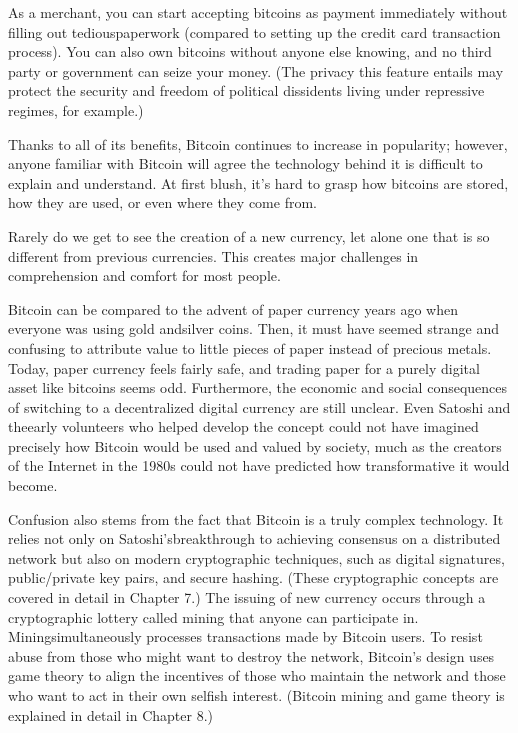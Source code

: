 \par As a merchant, you can start accepting bitcoins as payment immediately without filling out tediouspaperwork (compared to setting up the credit card transaction process). You can also own bitcoins without anyone else knowing, and no third party or government can seize your money. (The privacy this feature entails may protect the security and freedom of political dissidents living under repressive regimes, for example.)

\par Thanks to all of its benefits, Bitcoin continues to increase in popularity; however, anyone familiar with Bitcoin will agree the technology behind it is difficult to explain and understand. At first blush, it’s hard to grasp how bitcoins are stored, how they are used, or even where they come from.


\par Rarely do we get to see the creation of a new currency, let alone one that is so different from previous currencies. This creates major challenges in comprehension and comfort for most people.

\par Bitcoin can be compared to the advent of paper currency years ago when everyone was using gold andsilver coins. Then, it must have seemed strange and confusing to attribute value to little pieces of paper instead of precious metals. Today, paper currency feels fairly safe, and trading paper for a purely digital asset like bitcoins seems odd. Furthermore, the economic and social consequences of switching to a decentralized digital currency are still unclear. Even Satoshi and theearly volunteers who helped develop the concept could not have imagined precisely how Bitcoin would be used and valued by society, much as the creators of the Internet in the 1980s could not have predicted how transformative it would become.

\par Confusion also stems from the fact that Bitcoin is a truly complex technology. It relies not only on Satoshi’sbreakthrough to achieving consensus on a distributed network but also on modern cryptographic techniques, such as digital signatures, public/private key pairs, and secure hashing. (These cryptographic concepts are covered in detail in Chapter 7.) The issuing of new currency occurs through a cryptographic lottery called mining that anyone can participate in. Miningsimultaneously processes transactions made by Bitcoin users. To resist abuse from those who might want to destroy the network, Bitcoin’s design uses game theory to align the incentives of those who maintain the network and those who want to act in their own selfish interest. (Bitcoin mining and game theory is explained in detail in Chapter 8.)


